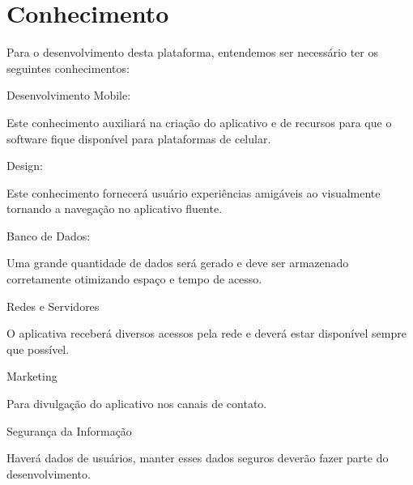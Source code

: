 \chapter[Conhecimento]{Conhecimento}

Para o desenvolvimento desta plataforma, entendemos ser necessário ter os seguintes conhecimentos:

\begin{alineas}
    \item Desenvolvimento Mobile:
        \par Este conhecimento auxiliará na criação do aplicativo e de recursos para que o software fique disponível para plataformas de celular.
    \item Design:
        \par Este conhecimento fornecerá usuário experiências amigáveis ao visualmente tornando a navegação no aplicativo fluente.
    \item Banco de Dados:
        \par Uma grande quantidade de dados será gerado e deve ser armazenado corretamente otimizando espaço e tempo de acesso.
    \item Redes e Servidores
        \par O aplicativa receberá diversos acessos pela rede e deverá estar disponível sempre que possível.
    \item Marketing
        \par Para divulgação do aplicativo nos canais de contato.
    \item Segurança da Informação
        \par Haverá dados de usuários, manter esses dados seguros deverão fazer parte do desenvolvimento.
\end{alineas}

